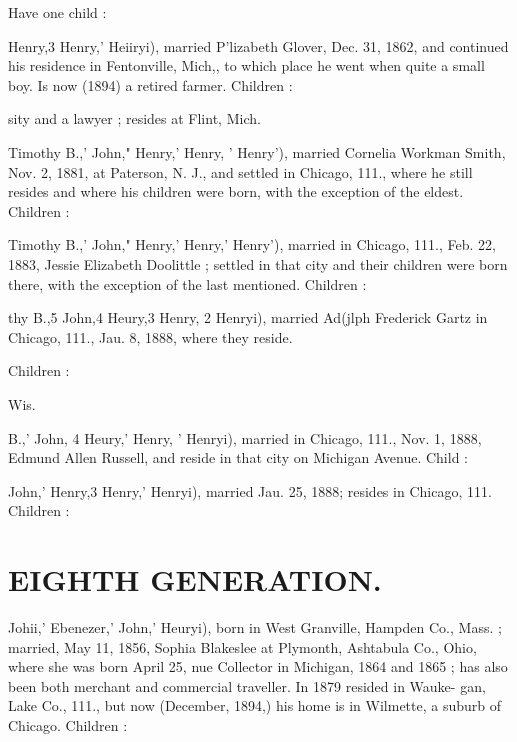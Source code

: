 \documentclass{book}
\begin{document}
Have one child : 


Henry,3 Henry,' Heiiryi), married P'lizabeth Glover, Dec. 31, 
1862, and continued his residence in Fentonville, Mich,, to which 
place he went when quite a small boy. Is now (1894) a retired 
farmer. Children : 

sity and a lawyer ; resides at Flint, Mich. 










Timothy B.,' John," Henry,' Henry, ' Henry'), married Cornelia 
Workman Smith, Nov. 2, 1881, at Paterson, N. J., and settled 
in Chicago, 111., where he still resides and where his children 
were born, with the exception of the eldest. Children : 





Timothy B.,' John," Henry,' Henry,' Henry'), married in 
Chicago, 111., Feb. 22, 1883, Jessie Elizabeth Doolittle ; settled 
in that city and their children were born there, with the exception 
of the last mentioned. Children : 









thy B.,5 John,4 Heury,3 Henry, 2 Henryi), married Ad(jlph 
Frederick Gartz in Chicago, 111., Jau. 8, 1888, where they reside. 

Children : 



Wis. 

B.,' John, 4 Heury,' Henry, ' Henryi), married in Chicago, 111., 
Nov. 1, 1888, Edmund Allen Russell, and reside in that city on 
Michigan Avenue. Child : 


John,' Henry,3 Henry,' Henryi), married Jau. 25, 1888; resides 
in Chicago, 111. Children : 




\section{EIGHTH GENERATION.}


Johii,' Ebenezer,' John,' Heuryi), born in West Granville, 
Hampden Co., Mass. ; married, May 11, 1856, Sophia Blakeslee 
at Plymonth, Ashtabula Co., Ohio, where she was born April 25, 
nue Collector in Michigan, 1864 and 1865 ; has also been both 
merchant and commercial traveller. In 1879 resided in Wauke- 
gan, Lake Co., 111., but now (December, 1894,) his home is in 
Wilmette, a suburb of Chicago. Children : 
\end{document}
